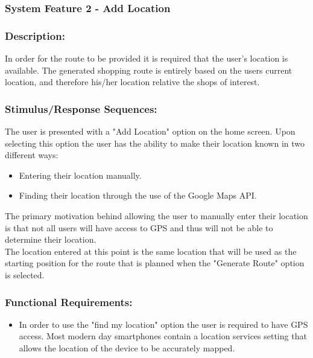 \documentclass[10pt,twocolumn]{witseiepaper}
\begin{document}
		\subsubsection{System Feature 2 - Add Location}
		
		\subsubsection*{Description:}
		
		In order for the route to be provided it is required that the user's location is available. The generated shopping route is entirely based on the users current location, and therefore his/her location relative the shops of interest. 
		
		\subsubsection*{Stimulus/Response Sequences:}
		
		The user is presented with a "Add Location" option on the home screen. Upon selecting this option the user has the ability to make their location known in two different ways:
		
		\begin{itemize}
			\item Entering their location manually.
			\item Finding their location through the use of the Google Maps API.
		\end{itemize}
		
		The primary motivation behind allowing the user to manually enter their location is that not all users will have access to GPS and thus will not be able to determine their location. \\
		
		The location entered at this point is the same location that will be used as the starting position for the route that is planned when the "Generate Route" option is selected.
		
		\subsubsection*{Functional Requirements:}
		
		\begin{itemize}
			\item In order to use the "find my location" option the user is required to have GPS access. Most modern day smartphones contain a location services setting that allows the location of the device to be accurately mapped. 
		\end{itemize}
		
\end{document}
